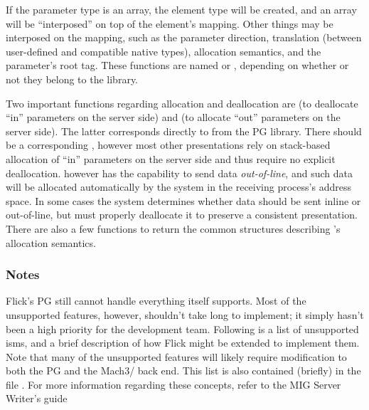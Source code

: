 If the parameter type is an array, the element type will be created, and an
array will be ``interposed'' on top of the element's mapping.  Other things may
be interposed on the mapping, such as the parameter direction, translation
(between user-defined and compatible native types), allocation semantics, and
the parameter's root tag.  These functions are named 
or , depending on whether or not they belong to
the \PRESC{} library.

Two important functions regarding allocation and deallocation are
 (to deallocate ``in'' parameters on
the server side) and  (to allocate
``out'' parameters on the server side).  The latter corresponds directly to
 from the PG library.  There
should be a corresponding ,
however most other presentations rely on stack-based allocation of ``in''
parameters on the server side and thus require no explicit deallocation.
\MIG{} however has the capability to send data \emph{out-of-line}, and such
data will be allocated automatically by the system in the receiving process's
address space.  In some cases the \RPC{} system determines whether data should
be sent inline or out-of-line, but must properly deallocate it to preserve a
consistent presentation.  There are also a few 
functions to return the common  structures describing
\MIG{}'s allocation semantics.

\subsubsection{Notes}

Flick's \MIG{} PG still cannot handle everything \MIG{} itself supports.  Most
of the unsupported features, however, shouldn't take long to implement; it
simply hasn't been a high priority for the development team.  Following is a
list of unsupported \MIG{}isms, and a brief description of how Flick might be
extended to implement them.  Note that many of the unsupported features will
likely require modification to both the \MIG{} PG and the Mach3/\MIG{} back
end.  This list is also contained (briefly) in the file .
For more information regarding these concepts, refer to the MIG Server Writer's
guide

